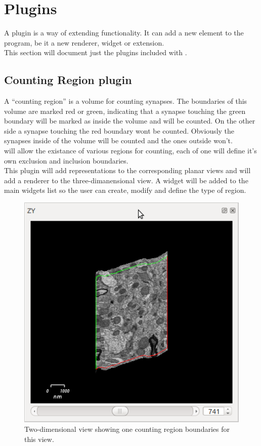 \section{Plugins}

A plugin is a way of extending \espina{} functionality. It can
add a new element to the program, be it a new renderer, widget or
extension. \\
This section will document just the plugins included with \espina.

\subsection{Counting Region plugin}

A ``counting region'' is a volume for counting synapses. The boundaries of this
volume are marked red or green, indicating that a synapse touching the green boundary
will be marked as inside the volume and will be counted. On the other side a synapse
touching the red boundary wont be counted. Obviously the synapses inside of the volume
will be counted and the ones outside won't.\\
\espina{} will allow the existance of various regions for counting, each of one will
define it's own exclusion and inclusion boundaries.\\
This plugin will add representations to the corresponding planar views and will add a 
renderer to the three-dimanensional view. A widget will be added to the main widgets list 
so the user can create, modify and define the type of region.\\

\begin{figure}[H]
\centering
\includegraphics[scale=0.5]{fig/plugin-ct-2Dwidget.png}
\caption{Two-dimensional view showing one counting region boundaries for this view.}
\end{figure}

